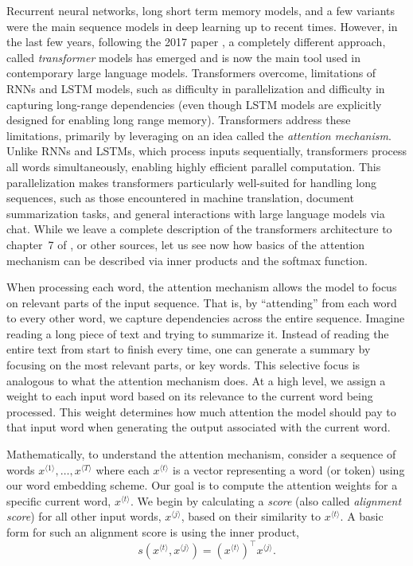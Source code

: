 Recurrent neural networks, long short term memory models, and a few variants were the main sequence models in deep learning up to recent times. However, in the last few years, following the 2017 paper \cite{vaswani2017attention}, a completely different approach, called {\em transformer} models has emerged and is now the main tool used in contemporary large language models. Transformers overcome, limitations of RNNs and LSTM models, such as difficulty in parallelization and difficulty in capturing long-range dependencies (even though LSTM models are explicitly designed for enabling long range memory). Transformers address these limitations, primarily by leveraging on an idea called the {\em attention mechanism}. Unlike RNNs and LSTMs, which process inputs sequentially, transformers process all words simultaneously, enabling highly efficient parallel computation. This parallelization makes transformers particularly well-suited for handling long sequences, such as those encountered in machine translation, document summarization tasks, and general interactions with large language models via chat. While we leave a complete description of the transformers architecture to  chapter~7 of \cite{LiquetMokaNazarathy2024DeepLearning}, or other sources, let us see now how basics of the attention mechanism can be described via inner products and the softmax function.

When processing each word, the attention mechanism allows the model to focus on relevant parts of the input sequence. That is, by ``attending'' from each word to every other word, we capture dependencies across the entire sequence. Imagine reading a long piece of text and trying to summarize it. Instead of reading the entire text from start to finish every time, one can generate a summary by focusing on the most relevant parts, or key words. This selective focus is analogous to what the attention mechanism does. At a high level, we assign a weight to each input word based on its relevance to the current word being processed. This weight determines how much attention the model should pay to that input word when generating the output associated with the current word. 

Mathematically, to understand the attention mechanism, consider a sequence of words $x^{{\langle 1 \rangle}},\ldots, x^{{\langle T \rangle}}$ where each $x^{{\langle t \rangle}}$ is a vector representing a word (or token) using our word embedding scheme. Our goal is to compute the attention weights for a specific current word, $x^{{\langle t \rangle}}$. %
We begin by calculating a {\em score} (also called {\em alignment score}) for all other input words, $x^{{\langle j \rangle}}$,  based on their similarity to $x^{{\langle t \rangle}}$. A basic form for such an alignment score is using the inner product,
%
\begin{equation}
\label{eq:score}
s(x^{{\langle t \rangle}},x^{{\langle j \rangle}})=(x^{{\langle t \rangle}})^\top x^{{\langle j \rangle}}.%
\end{equation}


